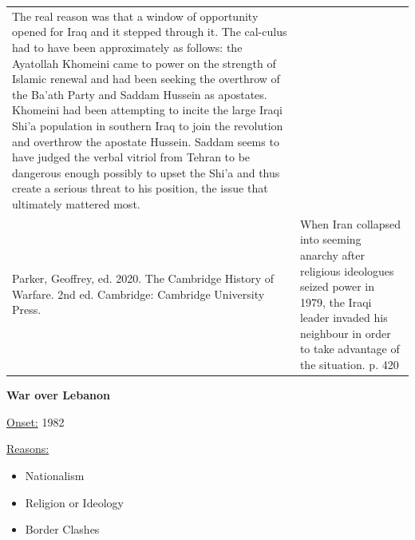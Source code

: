 {\begin{longtable}{p{}p{}}
The real reason was that a window of opportunity opened for Iraq and it stepped through it. The cal-culus had to have been approximately as follows: the Ayatollah Khomeini came to power on the strength of Islamic renewal and had been seeking the overthrow of the Ba'ath Party and Saddam Hussein as apostates. Khomeini had been attempting to incite the large Iraqi Shi'a population in southern Iraq to join the revolution and overthrow the apostate Hussein. Saddam seems to have judged the verbal vitriol from Tehran to be dangerous enough possibly to upset the Shi'a and thus create a serious threat to his position, the issue that ultimately mattered most.
\\
Parker, Geoffrey, ed. 2020. The Cambridge History of Warfare. 2nd ed. Cambridge: Cambridge University Press. & When Iran collapsed into seeming anarchy after religious ideologues seized power in 1979, the Iraqi leader invaded his neighbour in order to take advantage of the situation. p. 420
\\
\end{longtable}}
\clearpage
         \textbf{War over Lebanon} 

          \underline{Onset:} 1982         

\underline{Reasons:}
\begin{itemize}
\item Nationalism
\item Religion or Ideology
\item Border Clashes
\end{itemize}

